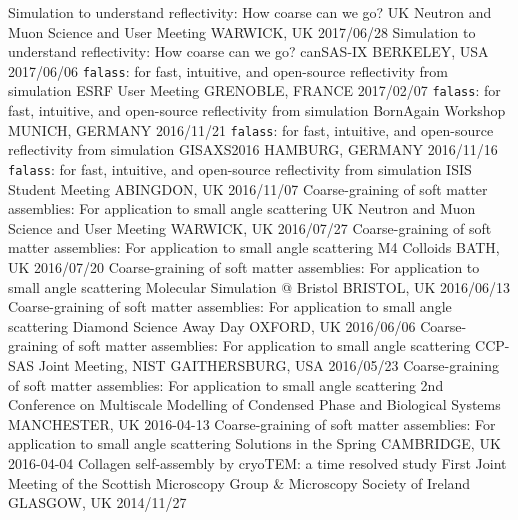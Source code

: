 \begin{cvhonors}
  \cvhonor
  	{Simulation to understand reflectivity: How coarse can we go?}
    {UK Neutron and Muon Science and User Meeting}
    {WARWICK, UK}
    {2017/06/28}
  \cvhonor
  	{Simulation to understand reflectivity: How coarse can we go?}
    {canSAS-IX}
    {BERKELEY, USA}
    {2017/06/06}
  \cvhonor
    {\texttt{falass}: for fast, intuitive, and open-source reflectivity from simulation}
    {ESRF User Meeting}
    {GRENOBLE, FRANCE}
    {2017/02/07}
  \cvhonor
    {\texttt{falass}: for fast, intuitive, and open-source reflectivity from simulation}
    {BornAgain Workshop}
    {MUNICH, GERMANY}
    {2016/11/21}
  \cvhonor
    {\texttt{falass}: for fast, intuitive, and open-source reflectivity from simulation}
    {GISAXS2016}
    {HAMBURG, GERMANY}
    {2016/11/16}
  \cvhonor
    {\texttt{falass}: for fast, intuitive, and open-source reflectivity from simulation}
    {ISIS Student Meeting}
    {ABINGDON, UK}
    {2016/11/07}
  \cvhonor
    {Coarse-graining of soft matter assemblies: For application to small angle scattering}
    {UK Neutron and Muon Science and User Meeting}
    {WARWICK, UK}
    {2016/07/27}
  \cvhonor
	{Coarse-graining of soft matter assemblies: For application to small angle scattering}
    {M4 Colloids}
    {BATH, UK}
    {2016/07/20}
  \cvhonor
    {Coarse-graining of soft matter assemblies: For application to small angle scattering}
    {Molecular Simulation @ Bristol}
    {BRISTOL, UK}
    {2016/06/13}
  \cvhonor
    {Coarse-graining of soft matter assemblies: For application to small angle scattering}
    {Diamond Science Away Day}
    {OXFORD, UK}
    {2016/06/06}
  \cvhonor
    {Coarse-graining of soft matter assemblies: For application to small angle scattering}
    {CCP-SAS Joint Meeting, NIST}
    {GAITHERSBURG, USA}
    {2016/05/23}
  \cvhonor
    {Coarse-graining of soft matter assemblies: For application to small angle scattering}
    {2nd Conference on Multiscale Modelling of Condensed Phase and Biological Systems}
    {MANCHESTER, UK}
    {2016-04-13}
  \cvhonor
    {Coarse-graining of soft matter assemblies: For application to small angle scattering}
    {Solutions in the Spring}
    {CAMBRIDGE, UK}
    {2016-04-04}
  \cvhonor
    {Collagen self-assembly by cryoTEM: a time resolved study}
    {First Joint Meeting of the Scottish Microscopy Group \& Microscopy Society of Ireland}
    {GLASGOW, UK}
    {2014/11/27}
\end{cvhonors}

